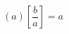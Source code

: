 \documentclass{article}
\begin{document}
\[\left(a\right)\left[\frac{b}{a}\right]=a\]
\end{document}
